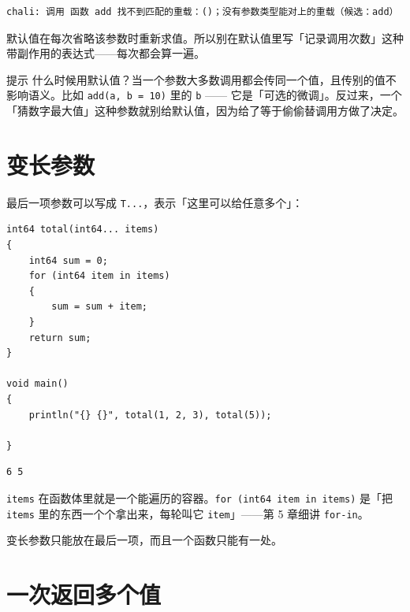 \par
\medskip
\begin{lstlisting}[style=out]
chali: 调用 函数 add 找不到匹配的重载：()；没有参数类型能对上的重载（候选：add）
\end{lstlisting}
\par
\medskip

默认值在每次省略该参数时重新求值。所以别在默认值里写「记录调用次数」这种带副作用的表达式——每次都会算一遍。

\begin{tip}{提示}
什么时候用默认值？当一个参数大多数调用都会传同一个值，且传别的值不影响语义。比如 \texttt{add(\allowbreak{}a,\allowbreak{} b =\allowbreak{} 10)\allowbreak{}} 里的 \texttt{b} —— 它是「可选的微调」。反过来，一个「猜数字最大值」这种参数就别给默认值，因为给了等于偷偷替调用方做了决定。
\end{tip}

\section{变长参数}

最后一项参数可以写成 \texttt{T.\allowbreak{}.\allowbreak{}.\allowbreak{}}，表示「这里可以给任意多个」：

\par
\medskip
\begin{lstlisting}[style=chali]
int64 total(int64... items)
{
    int64 sum = 0;
    for (int64 item in items)
    {
        sum = sum + item;
    }
    return sum;
}

void main()
{
    println("{} {}", total(1, 2, 3), total(5));

}
\end{lstlisting}
\par
\medskip

\par
\medskip
\begin{lstlisting}[style=out]
6 5
\end{lstlisting}
\par
\medskip

\texttt{items} 在函数体里就是一个能遍历的容器。\texttt{for (\allowbreak{}int64 item in items)\allowbreak{}} 是「把 \texttt{items} 里的东西一个个拿出来，每轮叫它 \texttt{item}」——第 5 章细讲 \texttt{for-in}。

变长参数只能放在最后一项，而且一个函数只能有一处。

\section{一次返回多个值}

